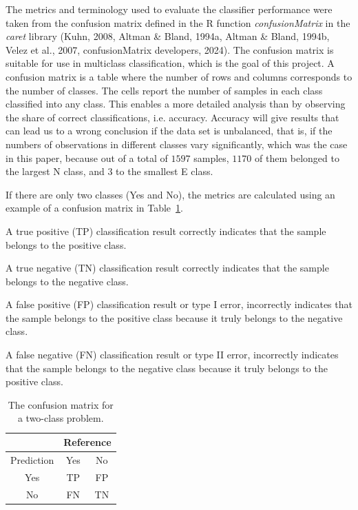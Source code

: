 \documentclass[sn-mathphys-num]{sn-jnl}%
\begin{document}
The metrics and terminology used to evaluate the classifier performance were taken from the confusion matrix defined in the R function \textit{confusionMatrix} in the \textit{caret} library (Kuhn, 2008, Altman & Bland, 1994a, Altman & Bland, 1994b, Velez et al., 2007, confusionMatrix developers, 2024). The confusion matrix is suitable for use in multiclass classification, which is the goal of this project. A confusion matrix is a table where the number of rows and columns corresponds to the number of classes. The cells report the number of samples in each class classified into any class. This enables a more detailed analysis than by observing the share of correct classifications, i.e. accuracy. Accuracy will give results that can lead us to a wrong conclusion if the data set is unbalanced, that is, if the numbers of observations in different classes vary significantly, which was the case in this paper, because out of a total of $1597$ samples, $1170$ of them belonged to the largest N class, and $3$ to the smallest E class.

If there are only two classes (Yes and No), the metrics are calculated using an example of a confusion matrix in Table~\ref{tab:cm}.

A true positive (TP) classification result correctly indicates that the sample belongs to the positive class.

A true negative (TN) classification result correctly indicates that the sample belongs to the negative class.
 
A false positive (FP) classification result or type I error, incorrectly indicates that the sample belongs to the positive class because it truly belongs to the negative class.

A false negative (FN) classification result or type II error, incorrectly indicates that the sample belongs to the negative class because it truly belongs to the positive class.

\begin{table}[!ht]
    \centering
    \caption{The confusion matrix for a two-class problem.}
	\label{tab:cm}
	\begin{tabular}{|c|c|c|}
		\hline
		 & \multicolumn{2}{|c|}{Reference} \\ \hline
        Prediction & Yes & No \\ \hline
        Yes & TP & FP \\ \hline
        No & FN & TN \\ \hline
	\end{tabular}
\end{table}
\end{document}

